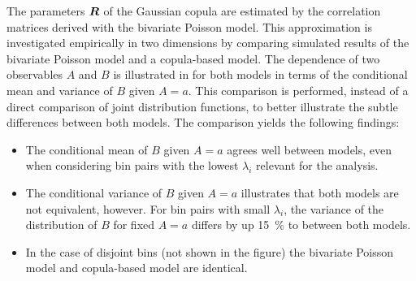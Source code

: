 The parameters $\bm{R}$ of the Gaussian copula are estimated by the
correlation matrices derived with the bivariate Poisson model. This
approximation is investigated empirically in two dimensions by comparing
simulated results of the bivariate Poisson model and a copula-based model. The
dependence of two observables $A$ and $B$ is illustrated in
 for both models in terms of the conditional
mean and variance of $B$ given $A = a$. This comparison is performed, instead of
a direct comparison of joint distribution functions, to better illustrate the
subtle differences between both models. The comparison yields the following
findings:
\begin{itemize}

\item The conditional mean of $B$ given $A = a$ agrees well between models, even
  when considering bin pairs with the lowest $\lambda_i$ relevant for the
  analysis.

\item The conditional variance of $B$ given $A = a$ illustrates that both models
  are not equivalent, however. For bin pairs with small $\lambda_i$, the
  variance of the distribution of $B$ for fixed $A = a$ differs by up
  \SI{15}{\percent} to between both models.

\item In the case of disjoint bins (not shown in the figure) the bivariate
  Poisson model and copula-based model are identical.

\end{itemize}

